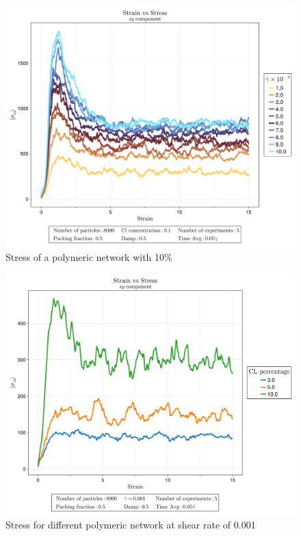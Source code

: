 \begin{figure}[ht!]
    \centering
    \includegraphics[width=\textwidth]{figs/ComputaitonalResults/CL10/StrainStressXY.png}
    \caption{Stress of a polymeric network with 10\%}
\end{figure}

\begin{figure}[ht!]
    \centering
    \includegraphics[width=\textwidth]{figs/ComputaitonalResults/dgamma1Stress.png}
    \caption{Stress for different polymeric network at shear rate of \num{0.001}}
\end{figure}


